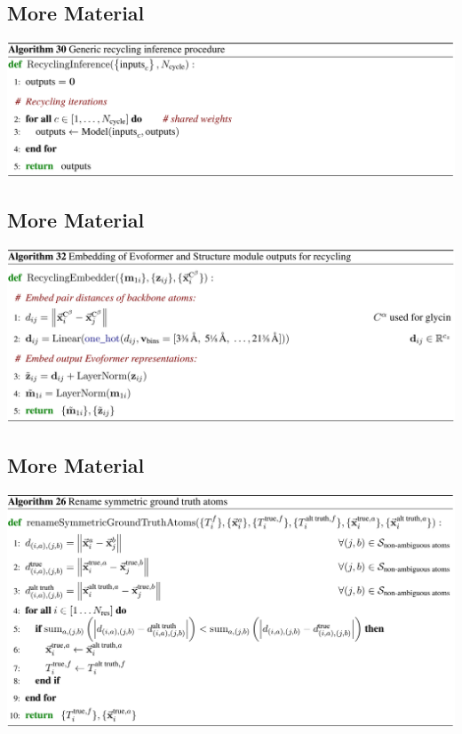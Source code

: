 \documentclass[presentation, smaller]{beamer}
\begin{document}
\subsection*{More Material}
\label{sec:orgb86f959}
\begin{center}
\includegraphics[width=.9\linewidth]{./imgs/recycling-algo30.png}
\end{center}
\subsection*{More Material}
\label{sec:org4c8a385}
\begin{center}
\includegraphics[width=.9\linewidth]{./imgs/recycling-embedding-algo32.png}
\end{center}
\subsection*{More Material}
\label{sec:orgf95881a}
\begin{center}
\includegraphics[width=.9\linewidth]{./imgs/rename-truth-atoms-algo26.png}
\end{center}
\end{document}
